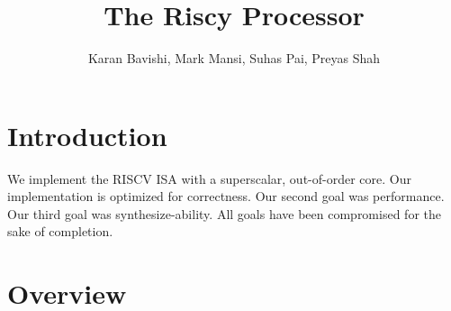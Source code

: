 \documentclass{article}
\title{The Riscy Processor}
\author{Karan Bavishi, Mark Mansi, Suhas Pai, Preyas Shah}
\begin{document}
\maketitle

\section{Introduction}

We implement the RISCV ISA with a superscalar, out-of-order core. Our
implementation is optimized for correctness. Our second goal was performance.
Our third goal was synthesize-ability. All goals have been compromised for the
sake of completion.

\section{Overview}
\end{document}
